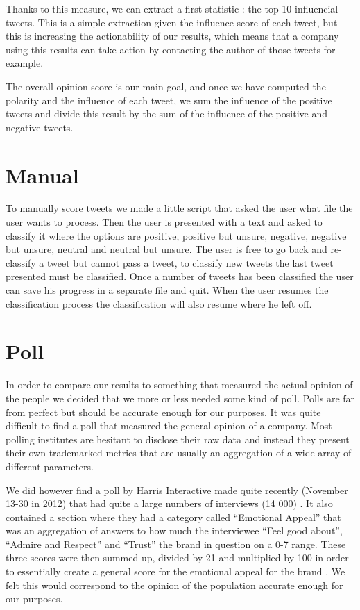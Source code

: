 \documentclass[a4paper,12pt]{report}
\begin{document}
Thanks to this measure, we can extract a first statistic : the top 10 influencial tweets. This is a simple extraction given the influence score of each tweet, but this is increasing the actionability of our results, which means that a company using this results can take action by contacting the author of those tweets for example.

The overall opinion score is our main goal, and once we have computed the polarity and the influence of each tweet, we sum the influence of the positive tweets and divide this result by the sum of the influence of the positive and negative tweets.

\section{Manual}

To manually score tweets we made a little script that asked the user what file the user wants to process. 
Then the user is presented with a text and asked to classify it where the options are positive, positive but unsure, negative, negative but unsure, neutral and neutral but unsure. 
The user is free to go back and re-classify a tweet but cannot pass a tweet, to classify new tweets the last tweet presented must be classified. 
Once a number of tweets has been classified the user can save his progress in a separate file and quit. 
When the user resumes the classification process the classification will also resume where he left off.

\section{Poll}

In order to compare our results to something that measured the actual opinion of the people we decided that we more or less needed some kind of poll. 
Polls are far from perfect but should be accurate enough for our purposes. It was quite difficult to find a poll that measured the general opinion of a company. 
Most polling institutes are hesitant to disclose their raw data and instead they present their own trademarked metrics that are usually an aggregation of a wide array of different parameters.

We did however find a poll by Harris Interactive made quite recently (November 13-30 in 2012) that had quite a large numbers of interviews (14 000) \cite{Harris13}. 
It also contained a section where they had a category called “Emotional Appeal” that was an aggregation of answers to how much the interviewee “Feel good about”, “Admire and Respect” and “Trust” the brand in question on a 0-7 range. 
These three scores were then summed up, divided by 21 and multiplied by 100 in order to essentially create a general score for the emotional appeal for the brand \cite{Harris13}. 
We felt this would correspond to the opinion of the population accurate enough for our purposes.
\end{document}
